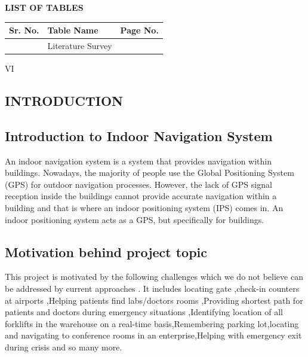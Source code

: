 \documentclass[a4paper, 12pt]{article}
\begin{document}
\begin{center}
\textbf{{\Large LIST OF TABLES}}
\end{center}

{\raggedright

\vspace{3pt} \noindent
\begin{tabular}{|p{120pt}|p{151pt}|p{151pt}|}
\hline
\parbox{120pt}{\centering Sr. No.} & 
\parbox{151pt}{\centering Table Name} & 
\parbox{151pt}{\centering Page No.} \\
\hline
\parbox{120pt}{} & 
\parbox{151pt}{\centering Literature Survey} & 
\parbox{151pt}{} \\
\hline
\end{tabular}
\vspace{2pt}

}
\newpage
\begin{center}
    VI
\end{center}
\listoffigures

\newpage


\begin{center}
\section{INTRODUCTION}
\end{center}
\subsection{Introduction to Indoor Navigation System}
\par
An indoor navigation system is a system that provides navigation within buildings. Nowadays, the majority of people use the Global Positioning System (GPS) for outdoor navigation processes. However, the lack of GPS signal reception inside the buildings cannot provide accurate navigation within a building and that is where an indoor positioning system (IPS) comes in. An indoor positioning system acts as a GPS, but specifically for buildings.
 \\ 
\subsection{Motivation behind project topic} 
\par
This project is motivated by the following challenges which we do not believe can be addressed by current approaches . It includes locating gate ,check-in counters at airports ,Helping patients find labs/doctors rooms ,Providing shortest path for patients and doctors during emergency situations ,Identifying location of all forklifts in the warehouse on a real-time basis,Remembering parking lot,locating and navigating to conference rooms in an enterprise,Helping with emergency exit during crisis and so many more.
\\
\end{document}
